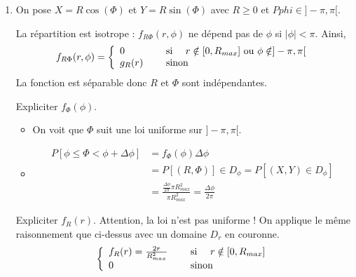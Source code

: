 \documentclass[main.tex]{subfiles}
\begin{document}
\begin{enumerate}
\begin{itemize}
	\item 
	\begin{align*}
	P[x\leq X<x+\Delta x] & = f_X(x) \Delta x \\
	& = P[(X,Y) \in D_x ] \\
	& = \frac{Aire D_x}{\pi R_{max}^2}
	\end{align*}
	\end{itemize}
	
On calcule de même $f_Y(y)$ et on remarque que $f_{XY}(x,y) \neq f_X(x)f_Y(y), \forall (x,y) \in D$. 

X et Y ne sont pas indépendantes.

\item On pose $X = R \cos(\Phi)$ et $Y = R \sin(\Phi)$ avec $R\geq 0$ et $Pphi \in ]-\pi,\pi[$.

La répartition est isotrope : $f_{R\Phi}(r,\phi)$ ne dépend pas de $\phi$ si $|\phi|<\pi$.
Ainsi, 
\[
f_{R\Phi}(r,\phi) = 
\left\{
\begin{array}{ll}
0 &\quad\text{ si }\quad r \notin [0,R_{max}] \text{ ou } \phi \notin ]-\pi,\pi[ \\
g_R(r) &\quad\text{ sinon}\quad
\end{array}
\right. 
\]
La fonction est séparable donc $R$ et $\Phi$ sont indépendantes.

Expliciter $f_\Phi(\phi)$.
\begin{itemize}
\item On voit que $\Phi$ suit une loi uniforme sur $]-\pi,\pi[$.
\item 
\begin{align*} 
P[\phi \leq \Phi < \phi + \Delta \phi ] & = f_{\Phi}(\phi)\Delta \phi \\
& = P[(R,\Phi)] \in D_{\phi} = P[(X,Y) \in D_{\phi}] \\
& = \frac{\frac{\Delta \phi}{2\pi}\pi R_{max}^2}{\pi R_{max}^2} = \frac{\Delta \phi}{2 \pi}
\end{align*}
\end{itemize}

Expliciter $f_R(r)$.
Attention, la loi n'est pas uniforme ! On applique le même raisonnement que ci-dessus avec un domaine $D_r$ en couronne.
\[
\left\{
\begin{array}{ll}
f_R(r) =  \frac{2r}{R_{max}^2} & \quad\text{ si }\quad r \notin [0,R_{max}] \\
0 &\quad\text{ sinon}\quad
\end{array}
\right. 
\]



\end{enumerate}
\end{document}

